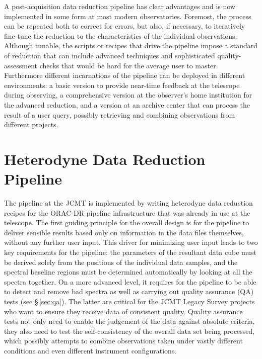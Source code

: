 \documentclass[final,authoryear,5p,times,twocolumn]{elsarticle}
\begin{document}
A post-acquisition data reduction pipeline has clear advantages and is
now implemented in some form at most modern observatories. Foremost,
the process can be repeated both to correct for errors, but also, if
necessary, to iteratively fine-tune the reduction to the
characteristics of the individual observations. Although tunable, the
scripts or recipes that drive the pipeline impose a standard of
reduction that can include advanced techniques and sophisticated
quality-assessment checks that would be hard for the average user to
master. Furthermore different incarnations of the pipeline can be
deployed in different environments: a basic version to provide
near-time feedback at the telescope during observing, a comprehensive
version at the observer's home institution for the advanced reduction,
and a version at an archive center that can process the result of a
user query, possibly retrieving and combining observations from
different projects.


\section{Heterodyne Data Reduction Pipeline}

The pipeline at the JCMT is implemented by writing heterodyne data
reduction recipes for the ORAC-DR pipeline infrastructure
\citep[][]{2011tfa..confE..42J,2015oracdr} that was already in
use at the telescope. The first guiding principle for the overall
design is for the pipeline to deliver sensible results based only on
information in the data files themselves, without any further user
input. This driver for minimizing user input leads to two key requirements
for the pipeline: the parameters of the resultant data cube must be
derived solely from the positions of the individual data samples, and
the spectral baseline regions must be determined automatically by
looking at all the spectra together.
On a more advanced level, it requires for the pipeline to be
able to detect and remove bad spectra as well as carrying out quality
assurance (QA) tests (see \S\,\ref{sec:qa}). The latter are critical
for the JCMT Legacy Survey projects
\citep{2007PASP..119..855W,2009ApJ...693.1736W,2007PASP..119..102P}
who want to ensure they receive data of consistent quality.  Quality
assurance tests not only need to enable the judgement of the data against absolute
criteria, they also need to test the self-consistency of the overall
data set being processed, which possibly attempts to combine
observations taken under vastly different conditions and even
different instrument configurations.
\end{document}
